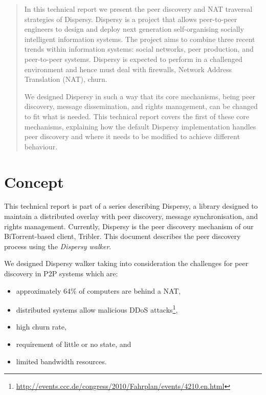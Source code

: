 

\begin{abstract}
In this technical report we present the peer discovery and NAT
traversal strategies of Dispersy.  Dispersy is a project that allows
peer-to-peer engineers to design and deploy next generation
self-organising socially intelligent information systems.  The project
aims to combine three recent trends within information systems: social
networks, peer production, and peer-to-peer systems.  Dispersy is
expected to perform in a challenged environment and hence must deal
with firewalls, Network Address Translation (NAT), churn.

We designed Dispersy in such a way that its core mechanisms, being
peer discovery, message dissemination, and rights management, can be
changed to fit what is needed.  This technical report covers the first
of these core mechanisms, explaining how the default Dispersy
implementation handles peer discovery and where it needs to be
modified to achieve different behaviour.
\end{abstract}

\newpage
\tableofcontents
\newpage
\listoffigures
\listoftables
\newpage


\section{Concept}
\label{sec-1}
This technical report is part of a series describing Dispersy, a
library designed to maintain a distributed overlay with peer
discovery, message synchronisation, and rights management.  Currently,
Dispersy is the peer discovery mechanism of our BiTorrent-based
client, Tribler\cite{pouwelse2008tribler}.  This document describes the peer discovery process
using the \emph{Dispersy walker}.

We designed Dispersy walker taking into consideration the challenges
for peer discovery in P2P systems which are:
\begin{itemize}
\item approximately 64\% of computers are behind a NAT\cite{halkes2011udp},
\item distributed systems allow malicious DDoS attacks\footnote{\url{http://events.ccc.de/congress/2010/Fahrplan/events/4210.en.html}},
\item high churn rate,
\item requirement of little or no state, and
\item limited bandwidth resources.
\end{itemize}

